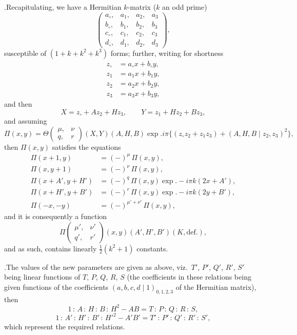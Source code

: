 \documentclass[11pt]{article}
\begin{document}
.\quad Recapitulating, we have a Hermitian $k$-matrix ($k$ an odd prime)
\[
\begin{pmatrix} a_{\circ}, & a_1, & a_2, & a_3 \\ b_{\circ}, & b_1, & b_2, & b_3 \\ c_{\circ}, & c_1, & c_2, & c_3 \\ d_{\circ}, & d_1, & d_2, & d_3 \end{pmatrix},
\]
susceptible of $(1+k+k^2+k^3)$ forms; further, writing for shortness
\begin{align*}
z_{\circ} &= a_{\circ}x+b_{\circ}y,\\
z_1 &= a_1x+b_1y,\\
z_2 &= a_2x+b_2y,\\
z_3 &= a_3x+b_3y,
\end{align*}
and then
\[
X = z_{\circ}+Az_2+Hz_3,\qquad Y = z_1+Hz_2+Bz_3,
\]
and assuming
\[
\Pi(x,y) = \Theta\!\begin{pmatrix} \mu, & \nu \\ q, & r \end{pmatrix}\!(X,Y)(A,H,B)\exp.i\pi\{(z_{\circ}z_2+z_1z_3)+(A,H,B\mid z_2,z_3)^2\},
\]
then $\Pi(x,y)$ satisfies the equations
\begin{align*}
\Pi(x+1,y) &= (-)^{\mu}\,\Pi(x,y),\\
\Pi(x,y+1) &= (-)^{\nu}\,\Pi(x,y),\\
\Pi(x+A',y+H') &= (-)^q\,\Pi(x,y)\exp.-i\pi k(2x+A'),\\
\Pi(x+H',y+B') &= (-)^r\,\Pi(x,y)\exp.-i\pi k(2y+B'),\\
\Pi(-x,-y) &= (-)^{\mu'+\nu'}\,\Pi(x,y),
\end{align*}
and it is consequently a function
\[
\Pi\!\begin{pmatrix} \mu', & \nu' \\ q', & r' \end{pmatrix}\!(x,y)(A',H',B')(K,\mathrm{def.}),
\]
and as such, contains linearly $\tfrac{1}{2}(k^2+1)$ constants.

\medskip

.\quad The values of the new parameters are given as above, viz.\ $T'$, $P'$, $Q'$, $R'$, $S'$ being linear functions of $T$, $P$, $Q$, $R$, $S$ (the coefficients in these relations being given functions of the coefficients $(a,b,c,d\mid 1)_{0,1,2,3}$ of the Hermitian matrix), then
\[
1 \,:\, A \,:\, H \,:\, B \,:\, H^2-AB = T \,:\, P \,:\, Q \,:\, R \,:\, S,
\]
\[
1 \,:\, A' \,:\, H' \,:\, B' \,:\, H'^2-A'B' = T' \,:\, P' \,:\, Q' \,:\, R' \,:\, S',
\]
which represent the required relations.
\end{document}
